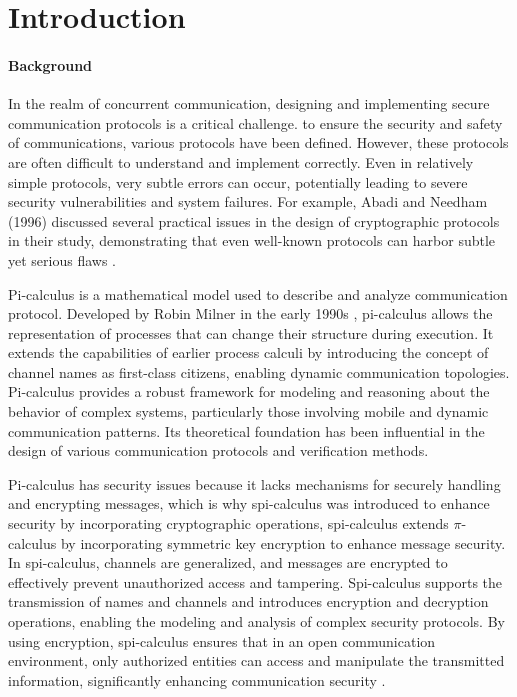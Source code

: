 \documentclass[master,english]{kuisthesis}
\theoremstyle{definition}
\begin{document}
\tableofcontents				%

\section{Introduction}\label{sec-intro}		%

\paragraph{Background}

In the realm of concurrent communication, designing and implementing secure communication protocols is a critical challenge. to ensure the security and safety of communications, various protocols have been defined. However, these protocols are often difficult to understand and implement correctly. Even in relatively simple protocols, very subtle errors can occur, potentially leading to severe security vulnerabilities and system failures. For example, Abadi and Needham (1996) discussed several practical issues in the design of cryptographic protocols in their study, demonstrating that even well-known protocols can harbor subtle yet serious flaws \cite{?}.


Pi-calculus is a mathematical model used to describe and analyze communication protocol. Developed by Robin Milner in the early 1990s \cite{?}, pi-calculus allows the representation of processes that can change their structure during execution. It extends the capabilities of earlier process calculi by introducing the concept of channel names as first-class citizens, enabling dynamic communication topologies. Pi-calculus provides a robust framework for modeling and reasoning about the behavior of complex systems, particularly those involving mobile and dynamic communication patterns. Its theoretical foundation has been influential in the design of various communication protocols and verification methods.

Pi-calculus has security issues because it lacks mechanisms for securely handling and encrypting messages, which is why spi-calculus was introduced to enhance security by incorporating cryptographic operations, spi-calculus extends $\pi$-calculus by incorporating symmetric key encryption to enhance message security\cite{?}. In spi-calculus, channels are generalized, and messages are encrypted to effectively prevent unauthorized access and tampering. Spi-calculus supports the transmission of names and channels and introduces encryption and decryption operations, enabling the modeling and analysis of complex security protocols. By using encryption, spi-calculus ensures that in an open communication environment, only authorized entities can access and manipulate the transmitted information, significantly enhancing communication security \cite{?}.
\end{document}
